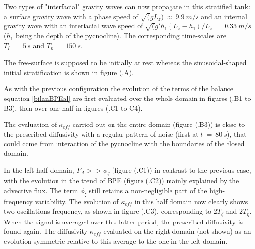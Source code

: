 Two types of "interfacial" gravity waves can now propagate in this stratified tank: a surface gravity wave with a phase speed of $\sqrt(g L_z) \ \approx \ 9.9\ m/s$ and an internal gravity wave with an interfacial wave speed of $\sqrt(g' h_1 (L_z-h_1)/L_z\ =\ 0.33\ m/s$ ($h_1$ being the depth of the pycnocline). The corresponding time-scales are $T_{\zeta} \ = \ 5 \ s$ and $T_{\eta} \ = \ 150 \ s$.

The free-surface is supposed to be initially at rest whereas the sinusoidal-shaped initial stratification is shown in figure (.A).

As with the previous configuration the evolution of the terms of the balance equation \ref{bilanBPEal} are first evaluated over the whole domain in figures (.B1 to B3), then over one half in figures (.C1 to C4).

The evaluation of $\kappa_{eff}$ carried out on the entire domain (figure (.B3)) is close to the prescribed diffusivity with a regular pattern of noise (first at $t\ =\ 80\ s$), that could come from interaction of the pycnocline with the boundaries of the closed domain.

In the left half domain, $F_A>>\phi_{\zeta}$ (figure (.C1)) in contrast to the previous case, with the evolution in the trend of BPE (figure (.C2)) mainly explained by the advective flux. The term $\phi_{\zeta}$ still retains a non-negligible part of the high-frequency variability. The evolution of $\kappa_{eff}$ in this half domain now clearly shows two oscillations frequency, as shown in figure (.C3), corresponding to $2T_{\zeta}$ and $2T_{\eta}$. When the signal is averaged over this latter period, the prescribed diffusivity is found again. The diffusivity $\kappa_{eff}$ evaluated on the right domain (not shown) as an evolution symmetric relative to this average to the one in the left domain.


